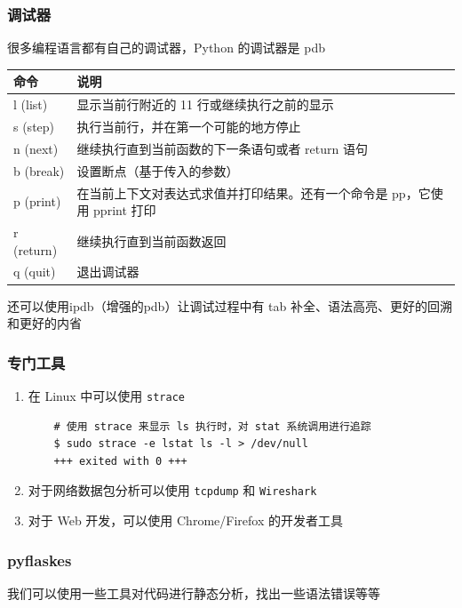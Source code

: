 \documentclass[a4paper,12pt]{ctexart}
\begin{document}
\subsubsection{调试器}
很多编程语言都有自己的调试器，Python 的调试器是 pdb

\begin{tabular}{|l|p{10cm}|}
\hline
\textbf{命令} & \textbf{说明} \\
\hline
l (list) & 显示当前行附近的 11 行或继续执行之前的显示 \\
\hline
s (step) & 执行当前行，并在第一个可能的地方停止 \\
\hline
n (next) & 继续执行直到当前函数的下一条语句或者 return 语句 \\
\hline
b (break) & 设置断点（基于传入的参数） \\
\hline
p (print) & 在当前上下文对表达式求值并打印结果。还有一个命令是 pp，它使用 pprint 打印 \\
\hline
r (return) & 继续执行直到当前函数返回 \\
\hline
q (quit) & 退出调试器 \\
\hline
\end{tabular}

还可以使用ipdb（增强的pdb）让调试过程中有 tab 补全、语法高亮、更好的回溯和更好的内省

\subsubsection{专门工具}
\begin{enumerate}
  \item 在 Linux 中可以使用 \texttt{strace}  
    \begin{lstlisting}
    # 使用 strace 来显示 ls 执行时，对 stat 系统调用进行追踪
    $ sudo strace -e lstat ls -l > /dev/null
    +++ exited with 0 +++
    \end{lstlisting}

  \item 对于网络数据包分析可以使用 \texttt{tcpdump} 和 \texttt{Wireshark}

  \item 对于 Web 开发，可以使用 Chrome/Firefox 的开发者工具
\end{enumerate}

\subsubsection{pyflaskes}
我们可以使用一些工具对代码进行静态分析，找出一些语法错误等等
\end{document}
